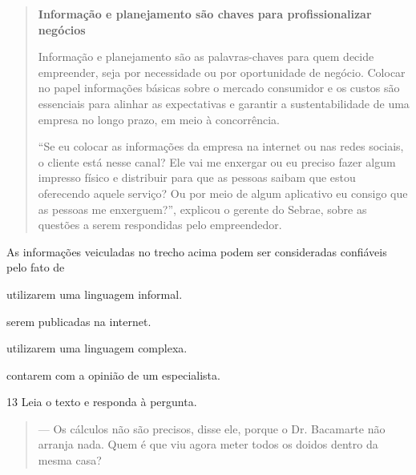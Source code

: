 \begin{quote}
\textbf{Informação e planejamento são chaves para profissionalizar negócios}

Informação e planejamento são as palavras-chaves para quem decide
empreender, seja por necessidade ou por oportunidade de negócio. Colocar
no papel informações básicas sobre o mercado consumidor e os custos são
essenciais para alinhar as expectativas e garantir a sustentabilidade de
uma empresa no longo prazo, em meio à concorrência.

``Se eu colocar as informações da empresa na internet ou nas redes
sociais, o cliente está nesse canal? Ele vai me enxergar ou eu preciso
fazer algum impresso físico e distribuir para que as pessoas saibam que
estou oferecendo aquele serviço? Ou por meio de algum aplicativo eu
consigo que as pessoas me enxerguem?'', explicou o gerente do Sebrae,
sobre as questões a serem respondidas pelo empreendedor.

\end{quote}

As informações veiculadas no trecho acima podem ser consideradas
confiáveis pelo fato de

\begin{escolha}
  \item utilizarem uma linguagem informal.

  \item serem publicadas na internet.

  \item utilizarem uma linguagem complexa.

  \item contarem com a opinião de um especialista.
\end{escolha}

\num{13} Leia o texto e responda à pergunta.

\begin{quote}
--- Os cálculos não são precisos, disse ele, porque o Dr. Bacamarte não
arranja nada. Quem é que viu agora meter todos os doidos dentro da mesma
casa?

\end{quote}


